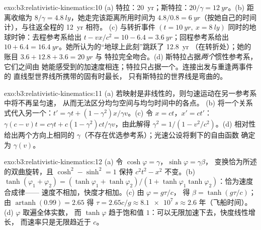 \begin{solution}{exo:b3:relativistic-kinematics:10}
(a) 特拉：\qty{20}{yr}；斯特拉：$20/\gamma = \qty{12}{yr}$。(b) 距离收缩为
$8/\gamma = \qty{4.8}{ly}$，她走完该距离所用时间为 $4.8/0.8
= \qty{6}{yr}$（按她自己的时间计），与往返全程的 \qty{12}{yr} 相符。
(c) 与转折事件 $(t =
\qty{10}{yr},\ x = \qty{8}{ly})$ 同时的地球时钟：去程参考系给出
$t - vx/c^2 = 10 - 6.4 = \qty{3.6}{yr}$；回程参考系给出 $10 +
6.4 = \qty{16.4}{yr}$。她所认为的“地球上此刻”跳跃了 \qty{12.8}{yr}
（在转折处）；她的账目 $3.6 + 12.8 + 3.6 = \qty{20}{yr}$ 与
特拉完全吻合。(d) 斯特拉占据\emph{两个}惯性参考系，它们之间由
她能感受到的加速度相连；特拉只占据一个。连接出发与重逢两事件的
直线型世界线所携带的固有时最长，
只有斯特拉的世界线是弯曲的。
\end{solution}

\begin{solution}{exo:b3:relativistic-kinematics:11}
(a) 若映射是非线性的，则匀速运动在另一参考系中将不再呈匀速，
从而无法区分均匀空间与均匀时间中的各点。
(b) 将一个关系式代入另一个：$t' = \gamma t +
(1 - \gamma^2)x/\gamma v$。(c) 令 $x = ct$，$x' = ct'$：
$\gamma(c - v)t = c\gamma t + c(1 - \gamma^2)ct/\gamma v$，由此解得
$\gamma^2 = 1/(1 - v^2/c^2)$。(d) 相对性给出两个方向上相同的
$\gamma$（不存在优选参考系）；光速公设将剩下的自由函数
确定为
$\gamma(v)$。
\end{solution}

\begin{solution}{exo:b3:relativistic-kinematics:12}
(a) 令 $\cosh\varphi = \gamma$，$\sinh\varphi = \gamma\beta$，
变换恰为所述的双曲旋转，且
$\cosh^2 - \sinh^2 = 1$ 保持 $c^2t^2 - x^2$ 不变。(b)
$\tanh(\varphi_1 + \varphi_2) = (\tanh\varphi_1 + \tanh\varphi_2)/(1 +
\tanh\varphi_1\tanh\varphi_2)$：恰为速度合成律——
速度不相加，快度才相加。(c) 由 $\varphi = g\tau/c$，
得 $\beta = \tanh(g\tau/c)$；由 $\operatorname{artanh}(0.99) = 2.65$ 得
$\tau = 2.65c/g \approx \qty{8.1e7}{s} \approx 2.6$ 年（飞船时间）。(d) $\varphi$ 取遍全体实数，
而 $\tanh\varphi$ 趋于饱和值
$1$：可以无限加速下去，快度线性增长，
而速率只是无限趋近于 $c$。
\end{solution}

